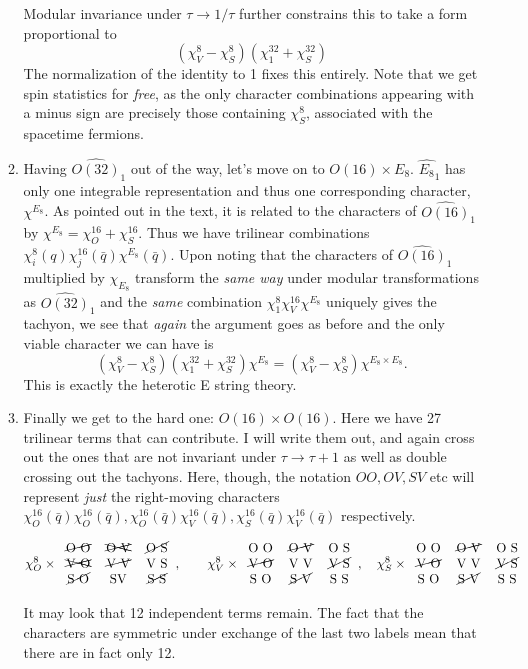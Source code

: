 \documentclass[11pt, class=article, crop=false]{standalone}
\begin{document}
\begin{enumerate}
\begin{enumerate}
	Modular invariance under $\tau \to 1/\tau$ further constrains this to take a form proportional to
	\[
		(\chi^8_V - \chi^8_S)(\chi^{32}_1 + \chi^{32}_S)
	\]
	The normalization of the identity to 1 fixes this entirely. Note that we get spin statistics for \emph{free}, as the only character combinations appearing with a minus sign are precisely those containing $\chi^8_S$, associated with the spacetime fermions. 
	\item Having $\widehat{O(32)}_1$ out of the way, let's move on to $O(16) \times E_8$. $\widehat{E_8}_1$ has only one integrable representation and thus one corresponding character, $\chi^{E_8}$. As pointed out in the text, it is related to the characters of $\widehat{O(16)}_1$ by $\chi^{E_8} = \chi_O^{16} + \chi_S^{16}$. Thus we have trilinear combinations $\chi_i^{8}(q) \chi_j^{16}(\bar q) \chi^{E_8} (\bar q)$. Upon noting that the characters of $\widehat{O(16)}_1$ multiplied by $\chi_{E_8}$ transform the \emph{same way} under modular transformations as $\widehat{O(32)}_1$ and the \emph{same} combination $\chi^8_1 \chi^{16}_V \chi^{E_8}$ uniquely gives the tachyon, we see that \emph{again} the argument goes as before and the only viable character we can have is
	\[
		(\chi^8_V - \chi^8_S)(\chi^{32}_1 + \chi^{32}_S) \chi^{E_8} = (\chi^8_V - \chi^8_S) \chi^{E_8 \times E_8}.
	\]
	This is exactly the heterotic E string theory. 
	\item Finally we get to the hard one: $O(16) \times O(16)$. Here we have 27 trilinear terms that can contribute. I will write them out, and again cross out the ones that are not invariant under $\tau \to \tau+1$ as well as double crossing out the tachyons. Here, though, the notation $OO, OV, SV$ etc will represent \emph{just} the right-moving characters $\chi_O^{16}(\bar q) \chi_O^{16} (\bar q), \chi_O^{16}(\bar q) \chi_V^{16} (\bar q), \chi_S^{16}(\bar q) \chi_V^{16} (\bar q)$ respectively. 
	\begin{center}
	\[
		\chi^{8}_O \times 		\begin{tabular}{c c c}
			\cancel{O O} & \xcancel{O V} & \cancel{O S}\\
			\xcancel{V O} & \cancel{V V} & V S\\
			\cancel{S O} & SV & \cancel{S S}
		\end{tabular},
		\qquad \chi^{8}_V \times 		\begin{tabular}{c c c}
			O O & \cancel{O V} & O S\\
			\cancel{V O} & V V & \cancel{V S}\\
			S O & \cancel{S V} & S S
		\end{tabular},
		\quad \chi^{8}_S \times 		\begin{tabular}{c c c}
			O O & \cancel{O V} & O S\\
			\cancel{V O} & V V & \cancel{V S}\\
			S O & \cancel{S V} & S S
		\end{tabular}
	\]
	\end{center}
	It may look that 12 independent terms remain. The fact that the characters are symmetric under exchange of the last two labels mean that there are in fact only 12. 
	

\end{enumerate}
\end{enumerate}
\end{document}
